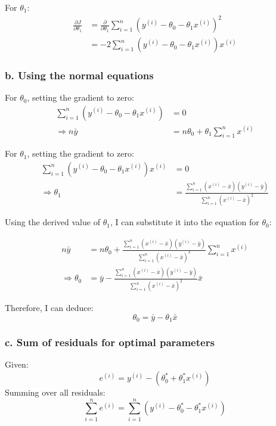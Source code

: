 \documentclass[10pt]{article}
\begin{document}
For \( \theta_1 \):
\begin{align*}
\frac{\partial J}{\partial \theta_1} &= \frac{\partial}{\partial \theta_1} \sum_{i=1}^{n} (y^{(i)} - \theta_0 - \theta_1 x^{(i)})^2 \\
&= -2\sum_{i=1}^{n} (y^{(i)} - \theta_0 - \theta_1 x^{(i)}) x^{(i)}
\end{align*}

\subsubsection*{b. Using the normal equations}

For \( \theta_0 \), setting the gradient to zero:
\begin{align*}
\sum_{i=1}^{n} (y^{(i)} - \theta_0 - \theta_1 x^{(i)}) &= 0 \\
\Rightarrow n\bar{y} &= n\theta_0 + \theta_1 \sum_{i=1}^{n} x^{(i)}
\end{align*}

For \( \theta_1 \), setting the gradient to zero:
\begin{align*}
\sum_{i=1}^{n} (y^{(i)} - \theta_0 - \theta_1 x^{(i)}) x^{(i)} &= 0 \\
\Rightarrow \theta_1 &= \frac{\sum_{i=1}^{n} (x^{(i)} - \bar{x})(y^{(i)} - \bar{y})}{\sum_{i=1}^{n} (x^{(i)} - \bar{x})^2}
\end{align*}

Using the derived value of \( \theta_1 \), I can substitute it into the equation for \( \theta_0 \):

\begin{align*}
n\bar{y} &= n\theta_0 + \frac{\sum_{i=1}^{n} (x^{(i)} - \bar{x})(y^{(i)} - \bar{y})}{\sum_{i=1}^{n} (x^{(i)} - \bar{x})^2} \sum_{i=1}^{n} x^{(i)} \\
\Rightarrow \theta_0 &= \bar{y} - \frac{\sum_{i=1}^{n} (x^{(i)} - \bar{x})(y^{(i)} - \bar{y})}{\sum_{i=1}^{n} (x^{(i)} - \bar{x})^2} \bar{x}
\end{align*}

Therefore, I can deduce:
\[ \theta_0 = \bar{y} - \theta_1 \bar{x} \]

\subsubsection*{c. Sum of residuals for optimal parameters}

Given:
\[ e^{(i)} = y^{(i)} - (\theta_0^* + \theta_1^* x^{(i)}) \]
Summing over all residuals:
\[ \sum_{i=1}^{n} e^{(i)} = \sum_{i=1}^{n} (y^{(i)} - \theta_0^* - \theta_1^* x^{(i)}) \]
\end{document}
